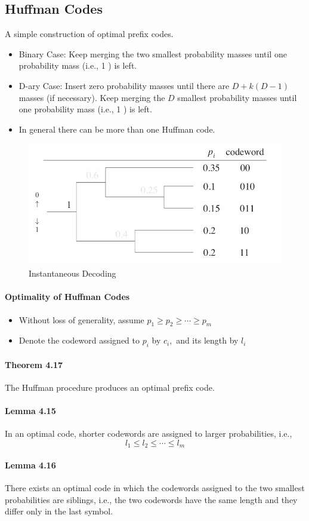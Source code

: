 \documentclass[8pt]{article}
\begin{document}
\subsection{Huffman Codes}
A simple construction of optimal prefix codes.
\begin{itemize}
    \item Binary Case: Keep merging the two smallest probability masses until one probability mass (i.e., 1 ) is left.
    \item D-ary Case: Insert zero probability masses until there are $D+k(D-1)$ masses (if necessary). Keep merging the $D$ smallest probability masses until one probability mass (i.e., 1 ) is left.
    \item In general there can be more than one Huffman code.
\end{itemize}
\begin{figure}[!h]
    \centering
    \includegraphics[width=0.5\linewidth]{imgs/exp4_16.png}
    \caption{Instantaneous Decoding}
    \label{fig:my_label}
\end{figure}

\paragraph{Optimality of Huffman Codes}
\begin{itemize}
    \item Without loss of generality, assume $p_{1} \geq p_{2} \geq \cdots \geq p_{m}$
    \item Denote the codeword assigned to $p_{i}$ by $c_{i},$ and its length by $l_{i}$
\end{itemize}

\begin{tcolorbox}
\paragraph{Theorem 4.17} The Huffman procedure produces an optimal prefix code.
\\
\paragraph{Lemma 4.15} In an optimal code, shorter codewords are assigned to larger probabilities, i.e.,
$$
l_{1} \leq l_{2} \leq \cdots \leq l_{m}
$$
\paragraph{Lemma 4.16} There exists an optimal code in which the codewords assigned to the two smallest probabilities are siblings, i.e., the two codewords have the same length and they differ only in the last symbol.

\end{tcolorbox}
\end{document}
